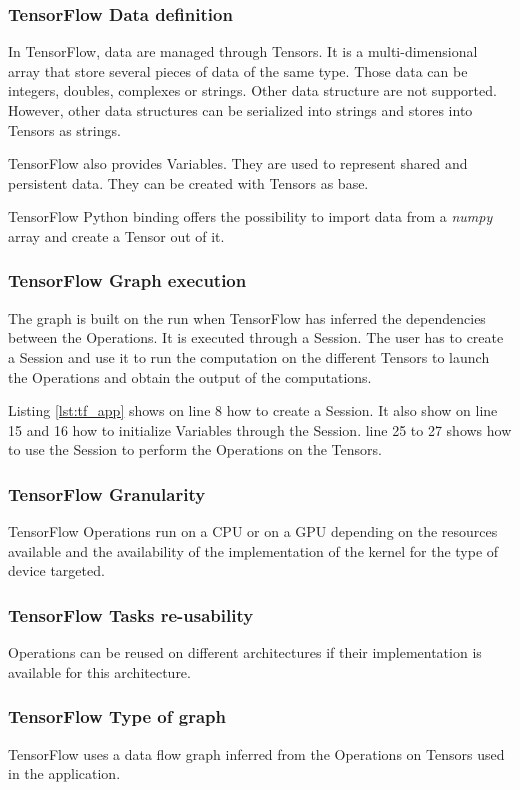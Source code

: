 \subsubsection{TensorFlow Data definition}
In TensorFlow, data are managed through Tensors.
It is a multi-dimensional array that store several pieces of data of the same type.
Those data can be integers, doubles, complexes or strings.
Other data structure are not supported.
However, other data structures can be serialized into strings and stores into Tensors as strings.

TensorFlow also provides Variables.
They are used to represent shared and persistent data.
They can be created with Tensors as base.

TensorFlow Python binding offers the possibility to import data from a \textit{numpy} array and create a Tensor out of it.

\subsubsection{TensorFlow Graph execution}
The graph is built on the run when TensorFlow has inferred the dependencies between the Operations.
It is executed through a Session.
The user has to create a Session and use it to run the computation on the different Tensors to launch the Operations and obtain the output of the computations.

Listing \ref{lst:tf_app} shows on line 8 how to create a Session.
It also show on line 15 and 16 how to initialize Variables through the Session.
line 25 to 27 shows how to use the Session to perform the Operations on the Tensors.


\subsubsection{TensorFlow Granularity}
TensorFlow Operations run on a CPU or on a GPU depending on the resources available and the availability of the implementation of the kernel for the type of device targeted.

\subsubsection{TensorFlow Tasks re-usability}
Operations can be reused on different architectures if their implementation is available for this architecture.

\subsubsection{TensorFlow Type of graph}
TensorFlow uses a data flow graph inferred from the Operations on Tensors used in the application.

